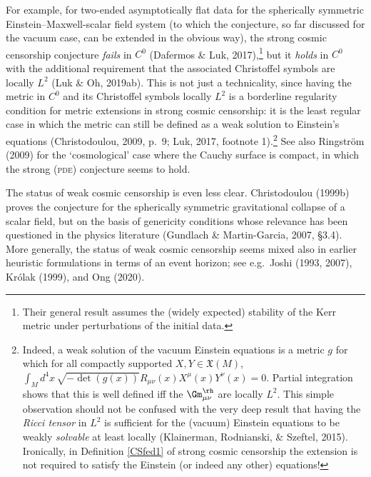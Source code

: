 \documentclass[11pt,a4paper]{article}
\newcommand{\pde}{\textsc{pde}}
\newcommand{\XM}{\mathfrak{X}(M)}
\begin{document}
  For example, for two-ended asymptotically flat data for the spherically symmetric Einstein--Max\-well-scalar field system (to which the  conjecture, so far discussed for the vacuum case, can be extended in the obvious way), the strong cosmic censorship conjecture \emph{fails} in $C^0$ (Dafermos \& Luk, 2017),\footnote{Their general result assumes the (widely expected) stability of the Kerr metric under perturbations of the initial data.}
   but it \emph{holds} in $C^0$ with the additional requirement that the associated Christoffel symbols are locally $L^2$ (Luk \& Oh, 2019ab). This is not just a technicality, since
having the metric in $C^0$  and its Christoffel symbols  locally  $L^2$ is a borderline
   regularity condition for metric extensions in strong cosmic censorship: it is the least regular case in which the metric 
    can still be  defined as a weak solution to Einstein's equations (Christodoulou, 2009, p.\ 9; Luk, 2017, footnote 1).\footnote{Indeed, a weak solution of the vacuum Einstein equations is a metric $g$ for which  for all compactly supported $X,Y\in\XM$,
$\int_M d^4x\, \sqrt{-\det(g(x))} R_{\mu\nu}(x)X^{\mu}(x)Y^{\nu}(x)=0$. Partial integration shows that this is well defined iff the $\Gm_{\mu\nu}^{\rh}$ are  locally $L^2$. This simple observation should not be confused with the very deep result that having 
 the \emph{Ricci tensor} in $L^2$ is sufficient for the (vacuum)  Einstein equations to be weakly \emph{solvable} at least locally
(Klainerman,   Rodnianski, \& Szeftel, 2015). Ironically, in  Definition \ref{CSfed1} of strong cosmic censorship 
 the extension is not required to satisfy the Einstein (or indeed any other) equations! } See  also Ringstr\"{o}m (2009) for the 
`cosmological'  case  where the Cauchy surface is 
 compact, in which the strong (\pde) conjecture seems to hold.


 The status of weak cosmic censorship is even less clear. Christodoulou (1999b)  proves the conjecture for the spherically symmetric gravitational collapse of a scalar field, but on the basis of genericity conditions whose  relevance has been questioned in the physics literature (Gundlach \& Martin-Garcia, 2007, \S 3.4). More generally, the status of weak cosmic censorship seems mixed also in earlier heuristic formulations in terms of  an event horizon; see e.g.\ Joshi (1993, 2007),  Kr\'{o}lak (1999), and Ong (2020).
\end{document}

